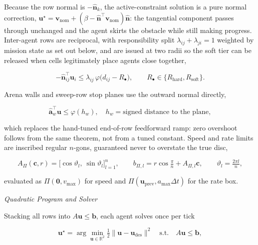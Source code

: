 \documentclass[10pt,letterpaper]{article}
\newcommand{\headingthree}[1]{%
    \par\vspace{6pt}%
    {\centering\fontsize{10}{12}\selectfont\itshape #1\par}%
    \vspace{2pt}\noindent\ignorespaces}
\begin{document}
Because the row normal is $-\hat{\mathbf{n}}_k$, the active-constraint solution is a pure
normal correction, $\mathbf{u}^\star=\mathbf{v}_{\mathrm{nom}}+(\beta-
    \hat{\mathbf{n}}^{\!\top}\mathbf{v}_{\mathrm{nom}})\hat{\mathbf{n}}$: the tangential
component passes through unchanged and the agent skirts the obstacle while still making
progress. Inter-agent rows are reciprocal, with responsibility split
$\lambda_{ij}+\lambda_{ji}=1$ weighted by mission state as set out below, and are issued at
two radii so the
soft tier can be released when cells legitimately place agents close together,

\begin{equation}
    \label{eq:e18}
    -\hat{\mathbf{n}}_{ij}^{\!\top}\mathbf{u}_i\le
    \lambda_{ij}\,\varphi\bigl(d_{ij}-R_\bullet\bigr),
    \qquad R_\bullet\in\{R_{\mathrm{hard}},R_{\mathrm{soft}}\}.
\end{equation}

Arena walls and sweep-row stop planes use the outward normal directly,

\begin{equation}
    \label{eq:e19}
    \hat{\mathbf{a}}_w^{\!\top}\mathbf{u}\le\varphi(h_w),
    \quad h_w=\text{signed distance to the plane},
\end{equation}

which replaces the hand-tuned end-of-row feedforward ramp: zero overshoot follows from the
same theorem, not from a tuned constant. Speed and rate limits are inscribed regular
$n$-gons, guaranteed never to overstate the true disc,

\begin{equation}
    \label{eq:e20}
    A_\Pi(\mathbf{c},r)=\bigl[\cos\vartheta_l,\ \sin\vartheta_l\bigr]_{l=1}^{n},
    \qquad
    b_{\Pi,l}=r\cos\tfrac{\pi}{n}+A_{\Pi,l}\mathbf{c},
    \qquad \vartheta_l=\tfrac{2\pi l}{n},
\end{equation}

evaluated as $\Pi(\mathbf{0},v_{\max})$ for speed and
$\Pi(\mathbf{u}_{\mathrm{prev}},a_{\max}\Delta t)$ for the rate box.

\headingthree{Quadratic Program and Solver}

Stacking all rows into $A\mathbf{u}\le\mathbf{b}$, each agent solves once per tick

\begin{equation}
    \label{eq:e21}
    \mathbf{u}^\star=\arg\min_{\mathbf{u}\in\mathbb{R}^2}
    \tfrac{1}{2}\|\mathbf{u}-\mathbf{u}_{\mathrm{des}}\|^2
    \quad\text{s.t.}\quad A\mathbf{u}\le\mathbf{b},
\end{equation}
\end{document}
